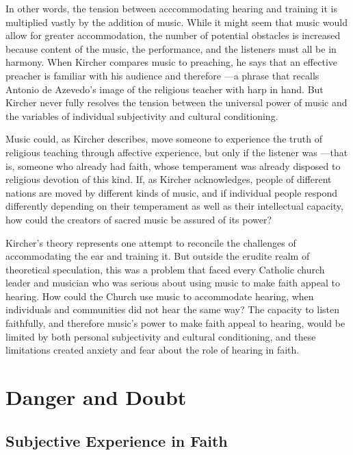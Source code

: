 In other words, the tension between acccommodating hearing and training it is multiplied vastly by the addition of music.
While it might seem that music would allow for greater accommodation, the number of potential obstacles is increased because content of the music, the performance, and the listeners must all be in harmony.
When Kircher compares music to preaching, he says that an effective preacher is familiar with his audience and therefore ---a phrase that recalls Antonio de Azevedo's image of the religious teacher with harp in hand.%
    \Autocite
    [551: .]
    {Kircher:Musurgia}
But Kircher never fully resolves the tension between the universal power of music and the variables of individual subjectivity and cultural conditioning.

Music could, as Kircher describes, move someone to experience the truth of religious teaching through affective experience, but only if the listener was ---that is, someone who already had faith, whose temperament was already disposed to religious devotion of this kind. 
If, as Kircher acknowledges, people of different nations are moved by different kinds of music, and if individual people respond differently depending on their temperament as well as their intellectual capacity, how could the creators of sacred music be assured of its power?

Kircher's theory represents one attempt to reconcile the challenges of accommodating the ear and training it. 
But outside the erudite realm of theoretical speculation, this was a problem that faced every Catholic church leader and musician who was serious about using music to make faith appeal to hearing.
How could the Church use music to accommodate hearing, when individuals and communities did not hear the same way? 
The capacity to listen faithfully, and therefore music's power to make faith appeal to hearing, would be limited by both personal subjectivity and cultural conditioning, and these limitations created anxiety and fear about the role of hearing in faith.

\section{Danger and Doubt}

\subsection{Subjective Experience in Faith}

